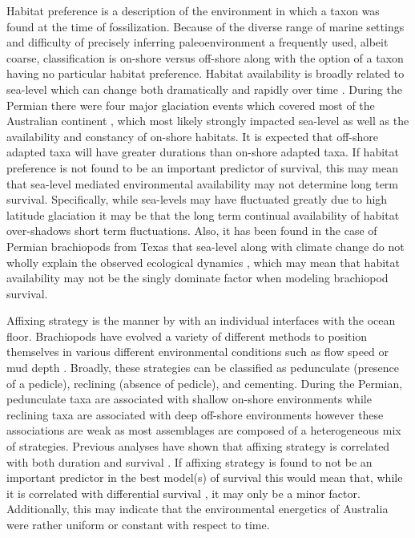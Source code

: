 \documentclass[12pt,letterpaper]{article}
\begin{document}
Habitat preference is a description of the environment in which a taxon was found at the time of fossilization. Because of the diverse range of marine settings and difficulty of precisely inferring paleoenvironment a frequently used, albeit coarse, classification is on-shore versus off-shore \citep{Sepkoski1991,Kiessling2007a,Bottjer1988,Jablonski1991,Jablonski1983b} along with the option of a taxon having no particular habitat preference. Habitat availability is broadly related to sea-level which can change both dramatically and rapidly over time \citep{Olszewski2004}. During the Permian there were four major glaciation events which covered most of the Australian continent \citep{Fielding2008,Birgenheier2010,Fielding2008a,Fielding2006}, which most likely strongly impacted sea-level as well as the availability and constancy of on-shore habitats. It is expected that off-shore adapted taxa will have greater durations than on-shore adapted taxa. If habitat preference is not found to be an important predictor of survival, this may mean that sea-level mediated environmental availability may not determine long term survival. Specifically, while sea-levels may have fluctuated greatly due to high latitude glaciation \citep{Fielding2008,Fielding2008a,Birgenheier2010} it may be that the long term continual availability of habitat over-shadows short term fluctuations. Also, it has been found in the case of Permian brachiopods from Texas that sea-level along with climate change do not wholly explain the observed ecological dynamics \citep{Olszewski2004}, which may mean that habitat availability may not be the singly dominate factor when modeling brachiopod survival. 

Affixing strategy is the manner by with an individual interfaces with the ocean floor. Brachiopods have evolved a variety of different methods to position themselves in various different environmental conditions such as flow speed or mud depth \citep{Rudwick1970,Alexander1977,LaBarbera1978,LaBarbera1981,Richardson1997}. Broadly, these strategies can be classified as pedunculate (presence of a pedicle), reclining (absence of pedicle), and cementing. During the Permian, pedunculate taxa are associated with shallow on-shore environments while reclining taxa are associated with deep off-shore environments \citep{Clapham2007} however these associations are weak as most assemblages are composed of a heterogeneous mix of strategies. Previous analyses have shown that affixing strategy is correlated with both duration and survival \citep{Alexander1977,Johansen1989}. If affixing strategy is found to not be an important predictor in the best model(s) of survival this would mean that, while it is correlated with differential survival \citep{Alexander1977,Johansen1989}, it may only be a minor factor. Additionally, this may indicate that the environmental energetics of Australia were rather uniform or constant with respect to time.
\end{document}
